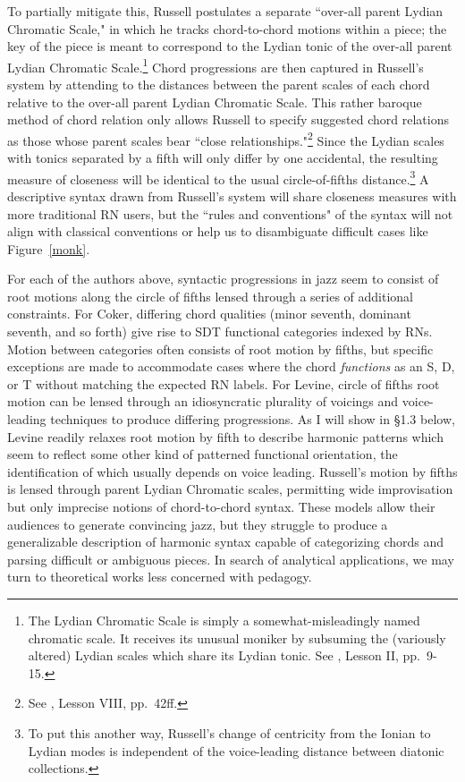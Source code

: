 To partially mitigate this, Russell postulates a separate ``over-all parent Lydian Chromatic Scale," in which he tracks chord-to-chord motions within a piece; the key of the piece is meant to correspond to the Lydian tonic of the over-all parent Lydian Chromatic Scale.\footnote{The Lydian Chromatic Scale is simply a somewhat-misleadingly named chromatic scale.  It receives its unusual moniker by subsuming the (variously altered) Lydian scales which share its Lydian tonic.  See \cite{russell1953}, Lesson II, pp.\ 9-15.}  Chord progressions are then captured in Russell's system by attending to the distances between the parent scales of each chord relative to the over-all parent Lydian Chromatic Scale.  This rather baroque method of chord relation only allows Russell to specify suggested chord relations as those whose parent scales bear ``close relationships."\footnote{See \cite{russell1953}, Lesson VIII, pp.\ 42ff.}  Since the Lydian scales with tonics separated by a fifth will only differ by one accidental, the resulting measure of closeness will be identical to the usual circle-of-fifths distance.\footnote{To put this another way, Russell's change of centricity from the Ionian to Lydian modes is independent of the voice-leading distance between diatonic collections.}  A descriptive syntax drawn from Russell's system will share closeness measures with more traditional RN users, but the ``rules and conventions" of the syntax will not align with classical conventions or help us to disambiguate difficult cases like Figure~\ref{monk}.

For each of the authors above, syntactic progressions in jazz seem to consist of root motions along the circle of fifths lensed through a series of additional constraints.  For Coker, differing chord qualities (minor seventh, dominant seventh, and so forth) give rise to SDT functional categories indexed by RNs.  Motion between categories often consists of root motion by fifths, but specific exceptions are made to accommodate cases where the chord \emph{functions} as an S, D, or T without matching the expected RN labels.  For Levine, circle of fifths root motion can be lensed through an idiosyncratic plurality of voicings and voice-leading techniques to produce differing progressions.  As I will show in \S 1.3 below, Levine readily relaxes root motion by fifth to describe harmonic patterns which seem to reflect some other kind of patterned functional orientation, the identification of which usually depends on voice leading.  Russell's motion by fifths is lensed through parent Lydian Chromatic scales, permitting wide improvisation but only imprecise notions of chord-to-chord syntax.  These models allow their audiences to generate convincing jazz, but they struggle to produce a generalizable description of harmonic syntax capable of categorizing chords and parsing difficult or ambiguous pieces.  In search of analytical applications, we may turn to theoretical works less concerned with pedagogy.

